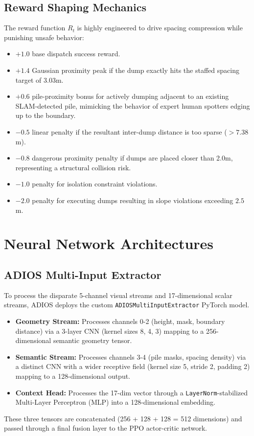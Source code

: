 \documentclass[conference]{IEEEtran}
\begin{document}
\subsection{Reward Shaping Mechanics}
The reward function $R_t$ is highly engineered to drive spacing compression while punishing unsafe behavior:
\begin{itemize}
    \item $+1.0$ base dispatch success reward.
    \item $+1.4$ Gaussian proximity peak if the dump exactly hits the staffed spacing target of $3.03$m.
    \item $+0.6$ pile-proximity bonus for actively dumping adjacent to an existing SLAM-detected pile, mimicking the behavior of expert human spotters edging up to the boundary.
    \item $-0.5$ linear penalty if the resultant inter-dump distance is too sparse ($> 7.38$m).
    \item $-0.8$ dangerous proximity penalty if dumps are placed closer than 2.0m, representing a structural collision risk.
    \item $-1.0$ penalty for isolation constraint violations.
    \item $-2.0$ penalty for executing dumps resulting in slope violations exceeding $2.5$m.
\end{itemize}

\section{Neural Network Architectures}

\subsection{ADIOS Multi-Input Extractor}
To process the disparate 5-channel visual streams and 17-dimensional scalar streams, ADIOS deploys the custom \texttt{ADIOSMultiInputExtractor} PyTorch model.
\begin{itemize}
    \item \textbf{Geometry Stream:} Processes channels 0-2 (height, mask, boundary distance) via a 3-layer CNN (kernel sizes 8, 4, 3) mapping to a 256-dimensional semantic geometry tensor.
    \item \textbf{Semantic Stream:} Processes channels 3-4 (pile masks, spacing density) via a distinct CNN with a wider receptive field (kernel size 5, stride 2, padding 2) mapping to a 128-dimensional output.
    \item \textbf{Context Head:} Processes the 17-dim vector through a \texttt{LayerNorm}-stabilized Multi-Layer Perceptron (MLP) into a 128-dimensional embedding.
\end{itemize}
These three tensors are concatenated (256 + 128 + 128 = 512 dimensions) and passed through a final fusion layer to the PPO actor-critic network.
\end{document}
